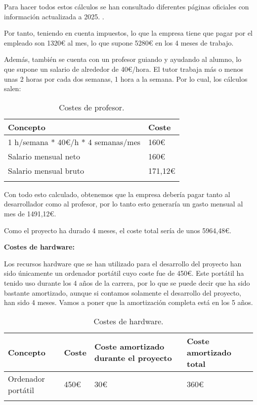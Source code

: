 Para hacer todos estos cálculos se han consultado diferentes páginas oficiales con información actualizada a 2025. \cite{web:retencion-bbva} \cite{web:tipos-cotizacion} \cite{web:retencion-irpf}.


Por tanto, teniendo en cuenta impuestos, lo que la empresa tiene que pagar por el empleado son 1320€ al mes, lo que supone 5280€ en los 4 meses de trabajo.

Además, también se cuenta con un profesor guiando y ayudando al alumno, lo que supone un salario de alrededor de 40€/hora. El tutor trabaja más o menos unas 2 horas por cada dos semanas, 1 hora a la semana. Por lo cual, los cálculos salen:

\begin{longtable}{@{} p{8cm} p{3cm} @{}}
  \toprule
  \rowcolor{gray!20}
  Concepto & Coste \\ 
  \midrule
  
  1 h/semana * 40€/h * 4 semanas/mes  & 160€ \\ 
  \midrule
  
  \endhead
  Salario mensual neto  & 160€ \\ 
  \midrule

  Salario mensual bruto & 171,12€ \\ 
  \midrule
  
  \bottomrule
  \caption{Costes de profesor.}
\end{longtable}

Con todo esto calculado, obtenemos que la empresa debería pagar tanto al desarrollador como al profesor, por lo tanto esto generaría un gasto mensual al mes de 1491,12€. 

Como el proyecto ha durado 4 meses, el coste total sería de unos 5964,48€.

\textbf{Costes de hardware:}

Los recursos hardware que se han utilizado para el desarrollo del proyecto han sido únicamente un ordenador portátil cuyo coste fue de 450€. Este portátil ha tenido uso durante los 4 años de la carrera, por lo que se puede decir que ha sido bastante amortizado, aunque si contamos solamente el desarrollo del proyecto, han sido 4 meses. Vamos a poner que la amortización completa está en los 5 años.

\begin{longtable}{@{} p{4cm} p{1cm} p{3cm} p{3cm} @{}}
  \toprule
  \rowcolor{gray!20}
  Concepto & Coste & Coste amortizado durante el proyecto & Coste amortizado total\\ 
  \midrule
  \endhead
  
  Ordenador portátil  & 450€ & 30€ & 360€\\ 
  \midrule

  
  \bottomrule
  \caption{Costes de hardware.}
\end{longtable}


